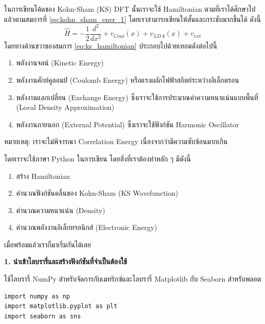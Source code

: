 ในการเขียนโค้ดของ Kohn-Sham (KS) DFT นั้นเราจะใช้ Hamiltonian ตามที่เราได้ศึกษาไปแล้วตามสมการที่ \eqref{eq:kohn_sham_ener_1} โดยเราสามารถเขียนให้สั้นและกระชับมากขึ้นได้ ดังนี้
%
\begin{equation}\label{eq:ks_hamiltonian}
    \hat{H} = -\frac{1}{2} \frac{d^2}{dx^2} + v_{Coul}(x) + v_{LDA}(x) + v_{ext}
\end{equation}
%
\noindent โดยทางด้านขวาของสมการ \eqref{eq:ks_hamiltonian} ประกอบไปด้วยเทอมดังต่อไปนี้
%
\begin{enumerate}[topsep=0pt,noitemsep]\setlength\itemsep{0.5em}
    \item พลังงานจลน์ (Kinetic Energy)

    \item พลังงานศักย์คูลอมป์ (Coulomb Energy) หรือแรงผลักไฟฟ้าสถิตย์ระหว่างอิเล็กตรอน

    \item พลังงานแลกเปลี่ยน (Exchange Energy) ซึ่งเราจะใช้การประมาณค่าความหนาแน่นแบบพื้นที่ (Local Density Approximation)

    \item พลังงานภายนอก (External Potential) ซึ่งเราจะใช้ฟังก์ชัน Harmonic Oscillator
\end{enumerate}

\noindent หมายเหตุ: เราจะไม่พิจารณา Correlation Energy เนื่องจากว่ามีความซับซ้อนมากเกิน

โดยเราจะใช้ภาษา Python ในการเขียน โดยสิ่งที่เราต้องทำหลัก ๆ มีดังนี้
%
\begin{enumerate}[topsep=0pt,noitemsep]\setlength\itemsep{0.5em}
    \item สร้าง Hamiltonian

    \item คำนวณฟังก์ชันคลื่นของ Kohn-Sham (KS Wavefunction)

    \item คำนวณความหนาแน่น (Density)

    \item คำนวณพลังงานอิเล็กทรอนิกส์ (Electronic Energy)
\end{enumerate}

\noindent เมื่อพร้อมแล้วเราก็มาเริ่มกันได้เลย

\noindent \textbf{1. นำเข้าไลบรารี่และสร้างฟังก์ชันที่จำเป็นต้องใช้}

ใช้ไลบรารี่ NumPy สำหรับจัดการกับเมทริกซ์และไลบรารี่ Matplotlib กับ Seaborn สำหรับพลอต

\begin{lstlisting}[style=MyPython]
import numpy as np
import matplotlib.pyplot as plt
import seaborn as sns
\end{lstlisting}

